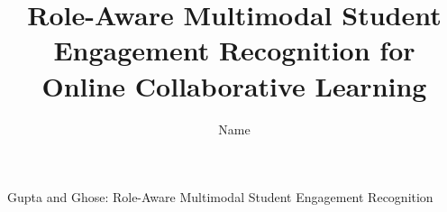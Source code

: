 \documentclass[journal]{IEEEtran}
\begin{document}
%
\title{Role-Aware Multimodal Student Engagement Recognition for Online Collaborative Learning}
%
%
%

\author{Name%
}

% 
%



%
{Gupta and Ghose: Role-Aware Multimodal Student Engagement Recognition}
% 
\end{document}
